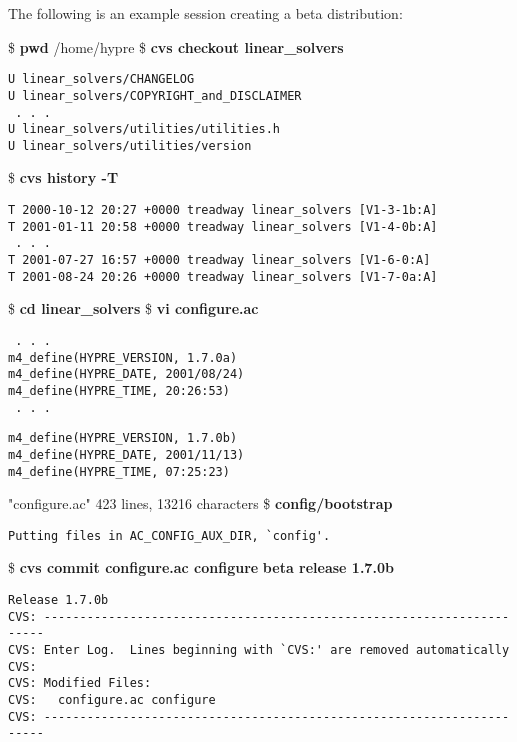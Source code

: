 The following is an example session creating a beta distribution:
\begin{ttfamily}
\begin{mdseries}
\linebreak
\$ \textbf{pwd}\linebreak
/home/hypre\linebreak
\$ \textbf{cvs checkout linear\_solvers}\linebreak
\begin{verbatim}
U linear_solvers/CHANGELOG
U linear_solvers/COPYRIGHT_and_DISCLAIMER
 . . .
U linear_solvers/utilities/utilities.h
U linear_solvers/utilities/version
\end{verbatim}
\$ \textbf{cvs history -T}\linebreak
\begin{verbatim}
T 2000-10-12 20:27 +0000 treadway linear_solvers [V1-3-1b:A]
T 2001-01-11 20:58 +0000 treadway linear_solvers [V1-4-0b:A]
 . . .
T 2001-07-27 16:57 +0000 treadway linear_solvers [V1-6-0:A]
T 2001-08-24 20:26 +0000 treadway linear_solvers [V1-7-0a:A]
\end{verbatim}
\$ \textbf{cd linear\_solvers}\linebreak
\$ \textbf{vi configure.ac}\linebreak
\begin{verbatim}
 . . .
m4_define(HYPRE_VERSION, 1.7.0a)
m4_define(HYPRE_DATE, 2001/08/24)
m4_define(HYPRE_TIME, 20:26:53)
 . . .
\end{verbatim}
\begin{bfseries}
\begin{verbatim}
m4_define(HYPRE_VERSION, 1.7.0b)
m4_define(HYPRE_DATE, 2001/11/13)
m4_define(HYPRE_TIME, 07:25:23)
\end{verbatim}
\end{bfseries}
"configure.ac" 423 lines, 13216 characters\linebreak
\$ \textbf{config/bootstrap}
\begin{verbatim}
Putting files in AC_CONFIG_AUX_DIR, `config'.
\end{verbatim}
\$ \textbf{cvs commit configure.ac configure}\linebreak
\textbf{beta release 1.7.0b}\linebreak
\begin{verbatim}
Release 1.7.0b
CVS: ----------------------------------------------------------------------
CVS: Enter Log.  Lines beginning with `CVS:' are removed automatically
CVS:
CVS: Modified Files:
CVS:   configure.ac configure
CVS: ----------------------------------------------------------------------

\end{verbatim}
\end{mdseries}
\end{ttfamily}
